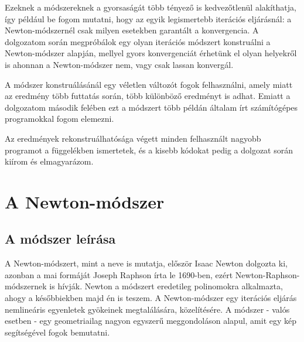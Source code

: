 \documentclass[a4paper,12pt]{report}
\begin{document}
		Ezeknek a módszereknek a gyorsaságát több tényező is kedvezőtlenül alakíthatja, így például be fogom mutatni, hogy az egyik legismertebb iterációs eljárásnál: a Newton-módszernél csak milyen esetekben garantált a konvergencia.  A dolgozatom során megpróbálok egy olyan iterációs módszert konstruálni a Newton-módszer alapján, mellyel gyors konvergenciát érhetünk el olyan helyekről is ahonnan a Newton-módszer nem, vagy csak lassan konvergál.

		A módszer konstruálásánál egy véletlen változót fogok felhasználni, amely miatt az eredmény több futtatás során, több különböző eredményt is adhat. Emiatt a dolgozatom második felében ezt a módszert több példán általam írt számítógépes programokkal fogom elemezni.

		Az eredmények rekonstruálhatósága végett minden felhasznált nagyobb programot a függelékben ismertetek, és a kisebb kódokat pedig a dolgozat során kiírom és elmagyarázom.












%
%


	\chapter{A Newton-módszer}













		\section{A módszer leírása}
			A Newton-módszert, mint a neve is mutatja, először Isaac Newton dolgozta ki, azonban a mai formáját Joseph Raphson írta le 1690-ben, ezért Newton-Raphson-módszernek is hívják. Newton a módszert eredetileg polinomokra alkalmazta, ahogy a későbbiekben majd én is teszem. A Newton-módszer egy iterációs eljárás nemlineáris egyenletek gyökeinek megtalálására, közelítésére. A módszer - valós esetben - egy geometriailag nagyon egyszerű meggondoláson alapul, amit egy kép segítségével fogok bemutatni.
\end{document}
